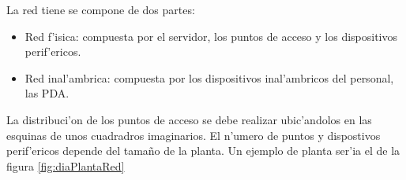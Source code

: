La red tiene se compone de dos partes:
\begin{itemize}
\item Red f'isica: compuesta por el servidor, los puntos de acceso y los dispositivos perif'ericos.
\item Red inal'ambrica: compuesta por los dispositivos inal'ambricos del personal, las PDA.
\end{itemize}
\begin{figure*}[h!]
	\begin{center}
        		\framebox{\includegraphics[scale=0.4{DiagramaRed.png}} 
     	\end{center}
    	\caption{Diagrama de red}
	\label{fig:diaRed}
\end{figure*}

La distribuci'on de los puntos de acceso se debe realizar ubic'andolos en las esquinas de unos cuadradros imaginarios. El n'umero de puntos y dispostivos  perif'ericos depende del tamaño de la planta. Un ejemplo de planta ser'ia el de la figura \ref{fig:diaPlantaRed}
\begin{figure*}[h!]
	\begin{center}
        		\framebox{\includegraphics[scale=0.4{plantaRed.png}} 
     	\end{center}
    	\caption{Mapa de una planta}
	\label{fig:diaPlantaRed}
\end{figure*}
